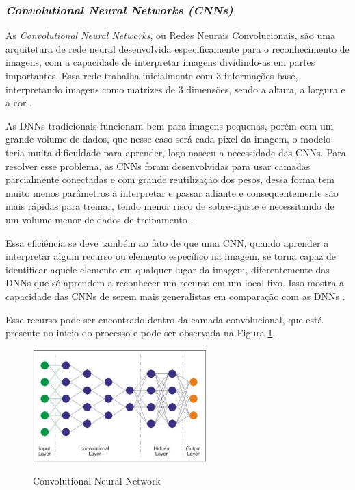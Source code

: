 \subsubsection{\emph{Convolutional Neural Networks (CNNs)}}
\label{sec:cnn}
As \emph{Convolutional Neural Networks}, ou Redes Neurais Convolucionais, são uma arquitetura de rede neural desenvolvida especificamente para o reconhecimento de imagens, com a capacidade de interpretar imagens dividindo-as em partes importantes. Essa rede trabalha inicialmente com 3 informações base, interpretando imagens como matrizes de 3 dimensões, sendo a altura, a largura e a cor \cite{deepLearningTensorFlow}.

As DNNs tradicionais funcionam bem para imagens pequenas, porém com um grande volume de dados, que nesse caso será cada pixel da imagem, o modelo teria muita dificuldade para aprender, logo nasceu a necessidade das CNNs. Para resolver esse problema, as CNNs foram desenvolvidas para usar camadas parcialmente conectadas e com grande reutilização dos pesos, dessa forma tem muito menos parâmetros à interpretar e passar adiante e consequentemente são mais rápidas para treinar, tendo menor risco de sobre-ajuste e necessitando de um volume menor de dados de treinamento \cite{deepLearningTensorFlow}.

Essa eficiência se deve também ao fato de que uma CNN, quando aprender a interpretar algum recurso ou elemento específico na imagem, se torna capaz de identificar aquele elemento em qualquer lugar da imagem, diferentemente das DNNs que só aprendem a reconhecer um recurso em um local fixo. Isso mostra a capacidade das CNNs de serem mais generalistas em comparação com as DNNs \cite{deepLearningTensorFlow}.

Esse recurso pode ser encontrado dentro da camada convolucional, que está presente no início do processo e pode ser observada na Figura \ref{fig:cnn}. 

\begin{figure}[!htb]
	\centering
	\caption{Convolutional Neural Network}
	\includegraphics[width=0.60\textwidth]{img/cnn.jpg}
	\label{fig:cnn}
\end{figure}

